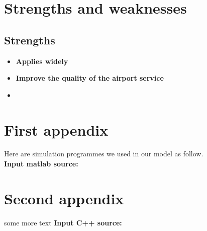 \documentclass{mcmthesis}
\begin{document}
\section{Strengths and weaknesses}


\subsection{Strengths}
\begin{itemize}
\item \textbf{Applies widely}\\

\item \textbf{Improve the quality of the airport service}\\

\item \textbf{}\\
\end{itemize}


\begin{appendices}

\section{First appendix}


Here are simulation programmes we used in our model as follow.\\

\textbf{\textcolor[rgb]{0.98,0.00,0.00}{Input matlab source:}}


\section{Second appendix}

some more text \textcolor[rgb]{0.98,0.00,0.00}{\textbf{Input C++ source:}}


\end{appendices}

	\nocite{*}



	
\end{document}
